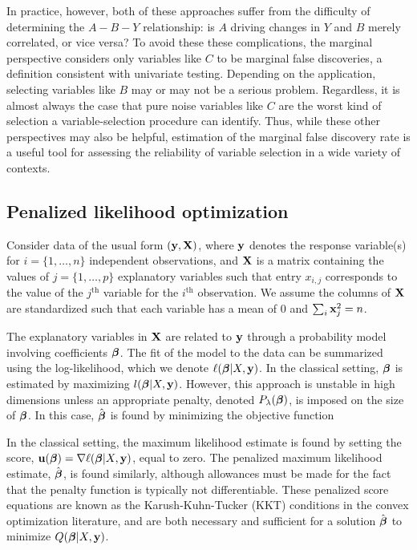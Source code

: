 In practice, however, both of these approaches suffer from the difficulty of determining the $A-B-Y$ relationship: is $A$ driving changes in $Y$ and $B$ merely correlated, or vice versa?  To avoid these these complications, the marginal perspective considers only variables like $C$ to be marginal false discoveries, a definition consistent with univariate testing.  Depending on the application, selecting variables like $B$ may or may not be a serious problem.  Regardless, it is almost always the case that pure noise variables like $C$ are the worst kind of selection a variable-selection procedure can identify.  Thus, while these other perspectives may also be helpful, estimation of the marginal false discovery rate is a useful tool for assessing the reliability of variable selection in a wide variety of contexts.

\subsection{Penalized likelihood optimization}

Consider data of the usual form $(\mathbf{y}, \mathbf{X})$, where $\mathbf{y}$ denotes the response variable(s) for $i = \{1, \ldots, n\}$ independent observations, and $\mathbf{X}$ is a matrix containing the values of $j = \{1, \ldots, p\}$ explanatory variables such that entry $x_{i,j}$ corresponds to the value of the $j^{\textrm{th}}$ variable for the $i^{\textrm{th}}$ observation.  We assume the columns of $\mathbf{X}$ are standardized such that each variable has a mean of $0$ and $\sum_i \mathbf{x}_j^2 = n$.

The explanatory variables in $\mathbf{X}$ are related to $\mathbf{y}$ through a probability model involving coefficients $\boldsymbol{\beta}$.  The fit of the model to the data can be summarized using the log-likelihood, which we denote $\ell(\boldsymbol{\beta}|X,\mathbf{y})$.  In the classical setting, $\boldsymbol{\beta}$ is estimated by maximizing $l(\boldsymbol{\beta}|X,\mathbf{y})$.  However, this approach is unstable in high dimensions unless an appropriate penalty, denoted $P_{\lambda}(\boldsymbol{\beta})$, is imposed on the size of $\boldsymbol{\beta}$.
In this case, $\hat{\boldsymbol{\beta}}$ is found by minimizing the objective function


In the classical setting, the maximum likelihood estimate is found by setting the score, $\mathbf{u}(\boldsymbol{\beta}) = \nabla \ell(\boldsymbol{\beta}|X,\mathbf{y})$, equal to zero.  The penalized maximum likelihood estimate, $\hat{\boldsymbol{\beta}}$, is found similarly, although allowances must be made for the fact that the penalty function is typically not differentiable.  These penalized score equations are known as the Karush-Kuhn-Tucker (KKT) conditions in the convex optimization literature, and are both necessary and sufficient for a solution $\hat{\boldsymbol{\beta}}$ to minimize $Q(\boldsymbol{\beta}|X,\mathbf{y})$.


